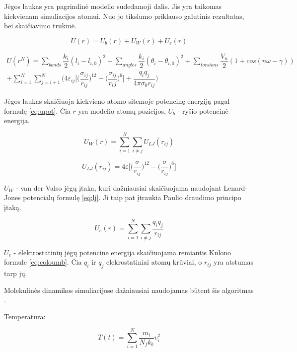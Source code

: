 Jėgos laukas yra pagrindinė modelio sudedamoji dalis.
Jis yra taikomas kiekvienam simuliacijos atomui.
Nuo jo tikslumo priklauso galutinis rezultatas, bei skaičiavimo trukmė.

\begin{equation} \label{eq:upot}
    U(r) = U_b(r) + U_W(r) + U_e(r)
\end{equation}

\begin{multline} \label{eq:upotdetailed}
    U(r^N) = \sum\limits_{bonds}{\dfrac {k_i} {2} (l_i - l_{i,0})^2} + \sum\limits_{angles}{\dfrac {k_i} {2} (\theta_i - \theta_{i,0})^2} + \sum\limits_{torsions}{\dfrac {V_n} {2} (1 + cos(n\omega - \gamma))} \\
  + \sum\limits_{i=1}^N \sum\limits_{j=i+1}^N {\bigg(4\varepsilon_{ij} \bigg[\bigg(\dfrac {\sigma_{ij}} {r_{ij}} \bigg)^12 - \bigg(\dfrac {\sigma_{ij}} {r_ij} \bigg)^6 \bigg] + \dfrac {q_iq_j} {4\pi\sigma_0r_{ij}}} \bigg)
\end{multline}

Jėgos laukas skaičiuoja kiekvieno atomo sitemoje potencinę energiją pagal formulę \ref{eq:upot}.
Čia \(r\) yra modelio atomų pozicijos, \(U_b\) - ryšio potencinė energija.

\begin{equation}
U_W(r) = \sum\limits_{i=1}^N \sum\limits_{i\neq j} {U_{LJ}(r_{ij})}
\end{equation}

\begin{equation} \label{eq:lj}
    U_{LJ}(r_{ij}) = 4\varepsilon\Bigg[\bigg(\dfrac \sigma {r_{ij}}\bigg)^{12} - \bigg(\dfrac \sigma {r_{ij}}\bigg)^6\Bigg]
\end{equation}

\(U_W\) - van der Valso jėgų įtaka, kuri dažniausiai skaičiuojama naudojant Lenard-Jones potencialų formulę \ref{eq:lj}.
Ji taip pat įtraukia Paulio draudimo principo įtaką.

\begin{equation} \label{eq:coloumb}
    U_{e}(r) = \sum\limits_{i=1}^N \sum\limits_{i\neq j} {\dfrac{q_i q_j}{r_{ij}}}
\end{equation}

\(U_e\) - elektrostatinių jėgų potencinė energija skaičiuojama remiantis Kulono formule \ref{eq:coloumb}.
Čia \(q_i\) ir \(q_j\) elekrostatiniai atomų krūviai, o \(r_{ij}\) yra atstumas tarp jų.

Molekulinės dinamikos simuliacijose dažniausiai naudojamas būtent šis algoritmas \cite{polar}.

Temperatura:

\begin{equation}
    T(t) = \sum\limits_{i=1}^N {\dfrac {m_i} {N_{f}k_{b}} v_i^2}
\end{equation}
